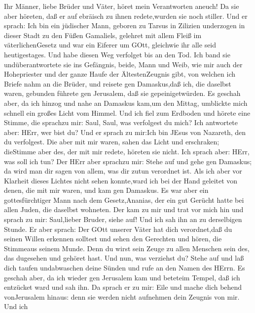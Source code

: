  Ihr Männer, liebe Brüder und Väter, höret mein Verantworten
aneuch!  Da sie aber höreten, daß er auf ebräisch zu ihnen
redete,wurden sie noch stiller. Und er sprach:  Ich bin ein
jüdischer Mann, geboren zu Tarsus in Zilizien underzogen in dieser Stadt
zu den Füßen Gamaliels, gelehret mit allem Fleiß im väterlichenGesetz
und war ein Eiferer um GOtt, gleichwie ihr alle seid heutigestages.
 Und habe diesen Weg verfolget bis an den Tod. Ich band sie
undüberantwortete sie ins Gefängnis, beide, Mann und Weib, 
wie mir auch der Hohepriester und der ganze Haufe der ÄltestenZeugnis
gibt, von welchen ich Briefe nahm an die Brüder, und reisete gen
Damaskus,daß ich, die daselbst waren, gebunden führete gen Jerusalem,
daß sie gepeinigetwürden.  Es geschah aber, da ich hinzog
und nahe an Damaskus kam,um den Mittag, umblickte mich schnell ein
großes Licht vom Himmel.  Und ich fiel zum Erdboden und
hörete eine Stimme, die sprachzu mir: Saul, Saul, was verfolgest du
mich?  Ich antwortete aber: HErr, wer bist du? Und er sprach
zu mir:Ich bin JEsus von Nazareth, den du verfolgest.  Die
aber mit mir waren, sahen das Licht und erschraken; dieStimme aber des,
der mit mir redete, höreten sie nicht.  Ich sprach aber:
HErr, was soll ich tun? Der HErr aber sprachzu mir: Stehe auf und gehe
gen Damaskus; da wird man dir sagen von allem, was dir zutun verordnet
ist.  Als ich aber vor Klarheit dieses Lichtes nicht sehen
konnte,ward ich bei der Hand geleitet von denen, die mit mir waren, und
kam gen Damaskus.  Es war aber ein gottesfürchtiger Mann
nach dem Gesetz,Ananias, der ein gut Gerücht hatte bei allen Juden, die
daselbst wohneten.  Der kam zu mir und trat vor mich hin
und sprach zu mir: Saul,lieber Bruder, siehe auf! Und ich sah ihn an zu
derselbigen Stunde.  Er aber sprach: Der GOtt unserer Väter
hat dich verordnet,daß du seinen Willen erkennen solltest und sehen den
Gerechten und hören, die Stimmeaus seinem Munde.  Denn du
wirst sein Zeuge zu allen Menschen sein des, das dugesehen und gehöret
hast.  Und nun, was verziehst du? Stehe auf und laß dich
taufen undabwaschen deine Sünden und rufe an den Namen des HErrn.
 Es geschah aber, da ich wieder gen Jerusalem kam und
beteteim Tempel, daß ich entzücket ward und sah ihn.  Da
sprach er zu mir: Eile und mache dich behend vonJerusalem hinaus: denn
sie werden nicht aufnehmen dein Zeugnis von mir.  Und ich
